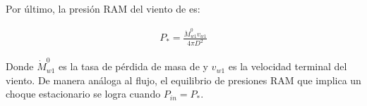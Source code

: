 Por último, la presión RAM del viento de \thC{} es:

\begin{align}
  P_* = \frac{\dot{M}^{0}_{w1}v_{w1}}{4\pi D^2} \label{eq:P-star}
\end{align}

 Donde $\dot{M}^{0}_{w1}$ es la tasa de pérdida de masa de \thC{} y $v_{w1}$ es la velocidad terminal del viento. De manera análoga al flujo, el equilibrio de presiones RAM que implica un choque estacionario se logra cuando $P_{in} = P_*$. %


